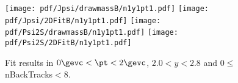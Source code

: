 \begin{figure}[H]
\begin{center}
\texttt{[image: pdf/Jpsi/drawmassB/n1y1pt1.pdf]}
\texttt{[image: pdf/Jpsi/2DFitB/n1y1pt1.pdf]}
\vspace*{-0.5cm}
\texttt{[image: pdf/Psi2S/drawmassB/n1y1pt1.pdf]}
\texttt{[image: pdf/Psi2S/2DFitB/n1y1pt1.pdf]}
\vspace*{-0.5cm}
\end{center}
\caption{Fit results in $0\gevc<\pt<2\gevc$, $2.0<y<2.8$ and 0$\leq$nBackTracks$<$8.}
\label{Fitn1y1pt1}
\end{figure}

